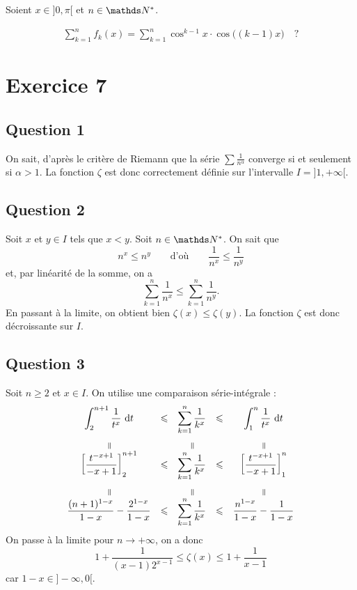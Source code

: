Soient $x \in {]0, \pi[}$\/ et $n \in \N^*$. 

\begin{align*}
	\sum_{k=1}^n f_k(x) = \sum_{k=1}^n \cos^{k-1} x \cdot \cos \big((k-1) x\big) \quad?
\end{align*}

\section{Exercice 7}
\subsection{Question 1}

On sait, d'après le critère de {\sc Riemann}\/ que la série $\sum \frac{1}{n^\alpha}$\/ converge si et seulement si $\alpha > 1$. La fonction $\zeta$\/ est donc correctement définie sur l'intervalle $I= {]1,+\infty[}$.

\subsection{Question 2}

Soit $x$\/ et $y \in I$\/ tels que $x < y$. Soit $n \in \N^*$. On sait que \[
	n^x \le n^y \qquad\text{d'où}\qquad \frac{1}{n^x} \le \frac{1}{n^y}
\] et, par linéarité de la somme, on a \[
	\sum_{k=1}^n \frac{1}{n^x} \le \sum_{k=1}^n \frac{1}{n^y}
.\] En passant à la limite, on obtient bien $\zeta(x) \le \zeta(y)$. La fonction $\zeta$ est donc décroissante sur $I$.

\subsection{Question 3}

Soit $n \ge 2$\/ et $x \in I$. On utilise une comparaison série-intégrale : \[
	\begin{array}{ccccc}
		\ds\int_{2}^{n+1} \frac{1}{t^x}~\mathrm{d}t &\le&\ds\sum_{k=1}^n \frac{1}{k^x} &\le&\ds\int_{1}^{n} \frac{1}{t^x}~\mathrm{d}t\\[2mm]
		\vrt=&&\vrt=&&\vrt=\\[2mm]
		\ds\left[ \frac{t^{-x+1}}{-x+1} \right]_2^{n+1} &\le& \ds\sum_{k=1}^n \frac{1}{k^x} &\le&\ds\left[ \frac{t^{-x+1}}{-x+1} \right]_1^n\\[2mm]
		\vrt=&&\vrt=&&\vrt=\\[2mm]
		\ds\frac{(n+1)^{1-x}}{1-x} - \frac{2^{1-x}}{1-x} &\le&\ds \sum_{k=1}^n \frac{1}{k^x}&\le&\ds\frac{n^{1-x}}{1-x} - \frac{1}{1-x}
	\end{array}
\]
On passe à la limite pour $n \to +\infty$, on a donc \[
	1 + \frac{1}{(x-1)2^{x-1}} \le \zeta(x) \le 1 + \frac{1}{x-1}
\] car $1-x \in {]-\infty,0[}$.

